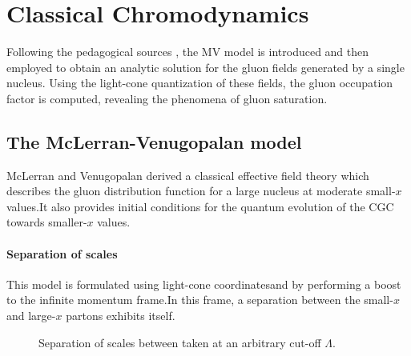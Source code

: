 \setchapterpreamble[u]{\margintoc}
\chapter{Classical Chromodynamics}

\begin{preview}[]
Following the pedagogical sources \cite{iancucgcintro, iancuphysicsofcgc, muellersmallx, iancunonlinear, taels}, the {\sffamily MV} model is introduced and then employed to obtain an analytic solution for the gluon fields generated by a single nucleus. Using the light-cone quantization of these fields, the gluon occupation factor is computed, revealing the phenomena of gluon saturation.
\end{preview}

\section{The McLerran-Venugopalan model}
McLerran and Venugopalan \cite{mclerven1,mclerven2,mclerven3} derived a classical effective field theory which describes the gluon distribution function for a large nucleus at moderate small-$x$ values.It also provides initial conditions for the quantum evolution of the {\sffamily CGC} towards smaller-$x$ values. 

\subsubsection*{Separation of scales} 
This model is formulated using light-cone coordinatesand by performing a boost to the infinite momentum frame.In this frame, a separation between the small-$x$ and large-$x$ partons exhibits itself.

\vspace{0.5cm}

\begin{figure}[!hbt]
	\centering
    
    \caption{\normalsize Separation of scales between taken at an arbitrary cut-off $\Lambda$.}
\end{figure}

